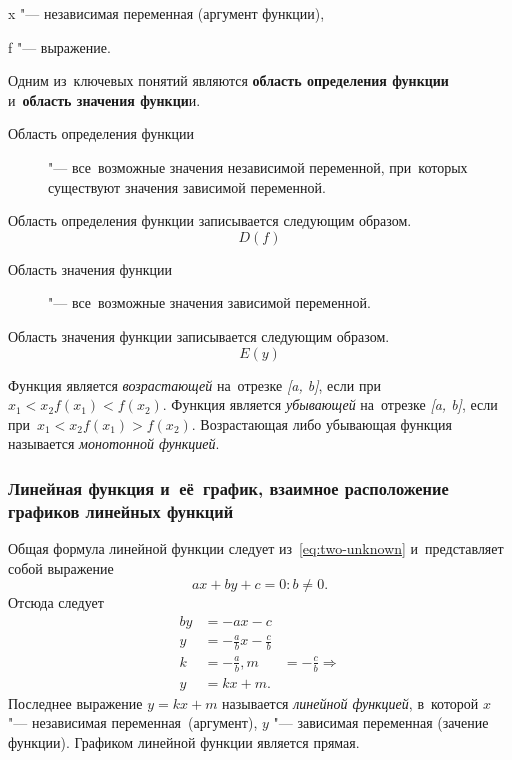 \documentclass[]{scrartcl}
\begin{document}
x "--- независимая переменная (аргумент функции),

f "--- выражение.

Одним из~ключевых понятий являются \textbf{область определения функции} и~\textbf{область значения функци}и.
\begin{description}
	\item[Область определения функции] "--- все~возможные значения независимой переменной, при~которых существуют значения зависимой переменной.
\end{description}
Область определения функции записывается следующим образом.
\begin{equation}\label{eq:function-domain}
D(f)
\end{equation}
\begin{description}
	\item[Область значения функции] "--- все~возможные значения зависимой переменной.
\end{description}
Область значения функции записывается следующим образом.
\begin{equation}\label{eq:function-exists}
E(y)
\end{equation}

Функция является \emph{возрастающей} на~отрезке \textit{[a, b]}, если при~$x_1 < x_2 f(x_1) < f(x_2)$. Функция является \emph{убывающей} на~отрезке \textit{[a, b]}, если при~$x_1 < x_2 f(x_1) > f(x_2)$. Возрастающая либо убывающая функция называется \emph{монотонной функцией}.

\subsubsection{Линейная функция и~её~график, взаимное расположение графиков линейных функций}

Общая формула линейной функции следует из~\ref{eq:two-unknown} и~представляет собой выражение
\begin{equation}\label{eq:linear-func-1}
ax+by+c=0: b\neq 0.
\end{equation}
Отсюда следует
\begin{equation}\label{eq:linear-func-2}
	\begin{aligned}
		by &= -ax-c\\
		y &= -\frac{a}{b}x - \frac{c}{b}\\
		k &= -\frac{a}{b}, m &= -\frac{c}{b} \Rightarrow \\
		y &= kx+m. 
	\end{aligned}
\end{equation}
Последнее выражение $y=kx+m$ называется \emph{линейной функцией}, в~которой $x$ "--- независимая переменная~(аргумент), $y$ "--- зависимая переменная (зачение функции). Графиком линейной функции является прямая.
\end{document}
